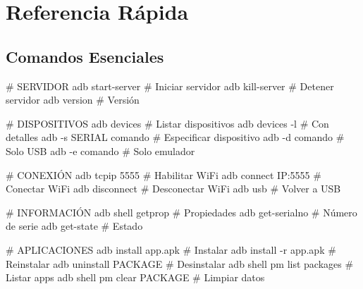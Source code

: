 \documentclass[
  doc,
  floatsintext,
  longtable,
  a4paper,
  nolmodern,
  notxfonts,
  notimes,
  12pt,
  colorlinks=true,linkcolor=blue,citecolor=blue,urlcolor=blue]{apa7}
\newenvironment{Shaded}{\begin{snugshade}}{\end{snugshade}}
\newcommand{\AttributeTok}[1]{\textcolor[rgb]{0.40,0.45,0.13}{#1}}
\newcommand{\CommentTok}[1]{\textcolor[rgb]{0.37,0.37,0.37}{#1}}
\newcommand{\ExtensionTok}[1]{\textcolor[rgb]{0.00,0.23,0.31}{#1}}
\newcommand{\NormalTok}[1]{\textcolor[rgb]{0.00,0.23,0.31}{#1}}
\begin{document}
\section{Referencia Rápida}\label{referencia-ruxe1pida}

\subsection{Comandos Esenciales}\label{comandos-esenciales}

\begin{Shaded}
\begin{Highlighting}[]
\CommentTok{\# SERVIDOR}
\ExtensionTok{adb}\NormalTok{ start{-}server              }\CommentTok{\# Iniciar servidor}
\ExtensionTok{adb}\NormalTok{ kill{-}server               }\CommentTok{\# Detener servidor}
\ExtensionTok{adb}\NormalTok{ version                   }\CommentTok{\# Versión}

\CommentTok{\# DISPOSITIVOS}
\ExtensionTok{adb}\NormalTok{ devices                   }\CommentTok{\# Listar dispositivos}
\ExtensionTok{adb}\NormalTok{ devices }\AttributeTok{{-}l}                \CommentTok{\# Con detalles}
\ExtensionTok{adb} \AttributeTok{{-}s}\NormalTok{ SERIAL comando         }\CommentTok{\# Especificar dispositivo}
\ExtensionTok{adb} \AttributeTok{{-}d}\NormalTok{ comando                }\CommentTok{\# Solo USB}
\ExtensionTok{adb} \AttributeTok{{-}e}\NormalTok{ comando                }\CommentTok{\# Solo emulador}

\CommentTok{\# CONEXIÓN}
\ExtensionTok{adb}\NormalTok{ tcpip 5555                }\CommentTok{\# Habilitar WiFi}
\ExtensionTok{adb}\NormalTok{ connect IP:5555           }\CommentTok{\# Conectar WiFi}
\ExtensionTok{adb}\NormalTok{ disconnect                }\CommentTok{\# Desconectar WiFi}
\ExtensionTok{adb}\NormalTok{ usb                       }\CommentTok{\# Volver a USB}

\CommentTok{\# INFORMACIÓN}
\ExtensionTok{adb}\NormalTok{ shell getprop             }\CommentTok{\# Propiedades}
\ExtensionTok{adb}\NormalTok{ get{-}serialno              }\CommentTok{\# Número de serie}
\ExtensionTok{adb}\NormalTok{ get{-}state                 }\CommentTok{\# Estado}

\CommentTok{\# APLICACIONES}
\ExtensionTok{adb}\NormalTok{ install app.apk           }\CommentTok{\# Instalar}
\ExtensionTok{adb}\NormalTok{ install }\AttributeTok{{-}r}\NormalTok{ app.apk        }\CommentTok{\# Reinstalar}
\ExtensionTok{adb}\NormalTok{ uninstall PACKAGE         }\CommentTok{\# Desinstalar}
\ExtensionTok{adb}\NormalTok{ shell pm list packages    }\CommentTok{\# Listar apps}
\ExtensionTok{adb}\NormalTok{ shell pm clear PACKAGE    }\CommentTok{\# Limpiar datos}


\end{Highlighting}
\end{Shaded}
\end{document}
